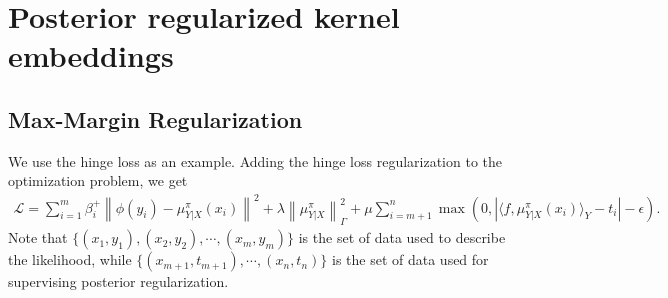 \documentclass[a4paper]{article}
\renewcommand{\cal}{\mathcal}
\newcommand{\norm}[1]{\left\lVert#1\right\rVert}
\begin{document}
\section{Posterior regularized kernel embeddings}
\subsection{Max-Margin Regularization}
We use the hinge loss as an example. Adding the hinge loss regularization to the optimization problem, we get
\begin{align}
\cal{L} = \sum_{i=1}^{m} \beta_i^+ \norm{\phi(y_i) - \mu_{Y|X}^\pi(x_i)}^2 + \lambda\norm{\mu_{Y|X}^\pi}_\Gamma^2 + \mu \sum_{i=m+1}^{n} \max (0, |\langle f, \mu_{Y|X}^\pi(x_i)\rangle_{Y} - t_i| - \epsilon).
\end{align}
Note that $\{(x_1,y_1),(x_2,y_2),\cdots,(x_m,y_m)\}$ is the set of data used to describe the likelihood, while $\{(x_{m+1},t_{m+1}),\cdots,(x_{n},t_{n}) \}$ is the set of data used for supervising posterior regularization.
\end{document}
